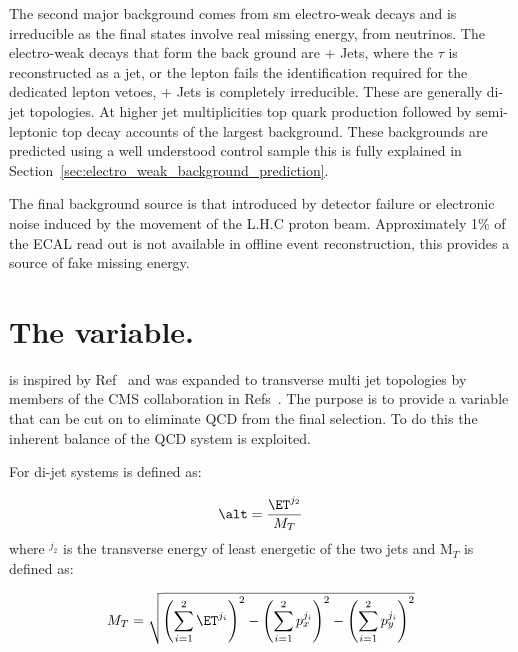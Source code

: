 The second major background comes from \ac{sm} electro-weak decays and 
is irreducible as the final states involve real missing energy, from 
neutrinos. The electro-weak decays that form the back ground are 
\HepProcess{\PW\to\Ptau\Pnu} + Jets, where the $\tau$ is reconstructed as a 
jet, or the lepton fails the identification required for the dedicated lepton 
vetoes, \HepProcess{\PZ\to\Pnu\APnu} + Jets is completely irreducible. These 
are generally di-jet topologies. At higher jet multiplicities top quark 
production followed by semi-leptonic top decay accounts of the largest 
background. These backgrounds are predicted using a well understood control 
sample this is fully explained in 
Section~\ref{sec:electro_weak_background_prediction}.


The final background source is that introduced by detector failure or 
electronic noise induced by the movement of the L.H.C proton beam.
Approximately 1$\%$ of the ECAL read out is not available in offline event 
reconstruction, this provides a source of fake missing energy.

\section{The \alt variable.} %
\label{sec:the_alpha___t_variable_}
\alt is inspired by Ref~\cite{Randall:2008dk} and was expanded to transverse 
multi jet topologies by members of the CMS collaboration in 
Refs~\cite{cms-pas-sus-08005,cms-pas-sus-09001}. The purpose is to provide a 
variable that can be cut on to eliminate QCD from the final selection. To do 
this the inherent balance of the QCD system is exploited.

For di-jet systems \alt is defined as:

\begin{equation}
  \alt = \frac{\ET^{j_{2}}}{M_{T}}
\end{equation}
where \ET$^{j_{2}}$ is the transverse energy of least energetic of the two jets 
and M$_{T}$ is defined as:

\begin{equation}
  M_{T} = \sqrt{\left(\sum^{2}_{i=1}\ET^{j_{i}}\right)^{2} - \left(\sum^{2}_{i=1}p_{x}^{j_{i}}\right)^{2} - \left(\sum^{2}_{i=1}p_{y}^{j_{i}}\right)^{2}}
\end{equation}

